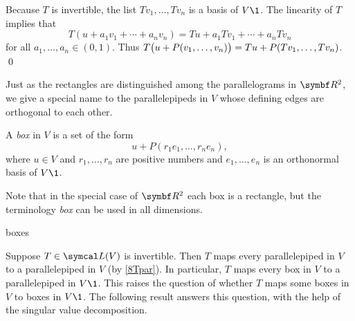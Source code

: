\proof
Because $T$ is invertible, the list $Tv_1, \ldots, Tv_n$ is a basis of $V\1$. The linearity of $T$ implies that
\[
T(u + a_1 v_1 + \cdots + a_n v_n) = Tu + a_1 Tv_1 + \cdots + a_n Tv_n
\]
for all $a_1, \ldots, a_n \in (0,1)$. Thus
$T \paren[\big]{ u + P(v_1, \ldots, v_n) } = Tu + P(Tv_1, \ldots, Tv_n)$.
\qed

Just as the rectangles are distinguished among the parallelograms in $\R2$, we give a special name to the parallelepipeds in $V$ whose defining edges are orthogonal to each other.

{A \emph{box} in $V$ is a set of the form
{
\addtolength{\abovedisplayskip}{-.05in} %
\addtolength{\belowdisplayskip}{-.05in} %
\[
u + P(r_1 e_1, \ldots, r_n e_n),
\]
where $u \in V$ and $r_1, \ldots, r_n$ are positive numbers and $e_1, \ldots, e_n$ is an ortho\-normal basis of $V\1$.}}

Note that in the special case of $\R2$ each box is a rectangle, but the terminology \textit{box} can be used in all dimensions.

{
\overfullrule=0in

\begin{example}[2boxes]{boxes}

\vspace{-.12in} %

\noindent\hspace*{-.1in}\begin{minipage}{2.5in}
\end{minipage}
\hspace{-.2in}
\vspace{-.05in}
\end{example}

}

Suppose $T \in \L(V)$ is invertible. Then $T$ maps every parallelepiped in $V$ to a parallelepiped in $V$ (by \ref{8Tpar}). In particular, $T$ maps every box in $V$ to a parallelepiped in $V\1$. This raises the question of whether $T$ maps some boxes in $V$ to boxes in $V\1$. The following result answers this question, with the help of the singular value decomposition.

